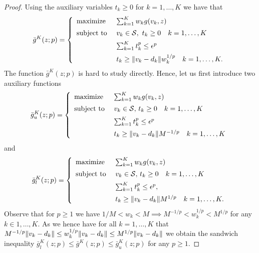 \begin{proof}
  Using the auxiliary variables $t_k\geq 0$ for $k= 1,\dots, K$ we have that
  \[
    \bar g^K(z; p)
    =
    \left\{
      \begin{array}{l@{~~~~}l}
	      \mbox{maximize} & \sum_{k=1}^K w_k g(v_k, z) \\[0.5em]
        \mbox{subject to} & v_k\in \supp, ~ t_k\geq 0\quad k = 1,\dots,K\\[0.5em]
             &  \sum_{k=1}^K t_k^p \leq \epsilon^p\\[0.5em]
             &  t_k\geq \norm{v_k-d_k} w_k^{1/p} \quad k  =1,\dots,K.
      \end{array}
    \right.
  \]
  The function $\bar g^K(z;p)$ is hard to study directly. Hence, let us first introduce two auxiliary functions
  \[
    \bar{g}^K_u(z; p)
    =
    \left\{
      \begin{array}{l@{~~~~}l}
	      \mbox{maximize} & \sum_{k=1}^K w_k g(v_k, z) \\[0.5em]
        \mbox{subject to} & v_k\in \supp, \, t_k\geq 0 \quad k = 1,\dots,K\\[0.5em]
             &  \sum_{k=1}^K t_k^p \leq \epsilon^p\\[0.5em]
             &  t_k\geq \norm{v_k-d_k} M^{-1/p} \quad k = 1,\dots,K
      \end{array}
    \right.
  \]
  and
    \[
    \bar{g}^K_l(z; p)
    =
    \left\{
      \begin{array}{l@{~~~~}l}
	      \mbox{maximize} & \sum_{k=1}^K w_k g(v_k, z) \\[0.5em]
        \mbox{subject to} & v_k\in \supp, \, t_k\geq 0 \quad k = 1,\dots,K\\[0.5em]
             &  \sum_{k=1}^K t_k^p \leq \epsilon^p,\\[0.5em]
             &  t_k\geq \norm{v_k-d_k} M^{1/p} \quad k = 1,\dots,K.
      \end{array}
    \right.
  \]
  Observe that for $p\geq 1$ we have $1/M<w_k<M \implies M^{-1/p} < w^{1/p}_k < M^{1/p}$ for any $k\in 1,\dots, K$.
  As we hence have for all $k= 1,\dots, K$ that
  \(
    M^{-1/p} \| v_k-d_k \| \leq w_k^{1/p} \| v_k-d_k \|  \leq M^{1/p} \| v_k-d_k \|
  \)
  we obtain the sandwich inequality $\bar{g}^K_l(z; p) \leq \bar{g}^K(z; p) \leq \bar{g}^K_u(z; p)$ for any $p\geq 1$.


\end{proof}
